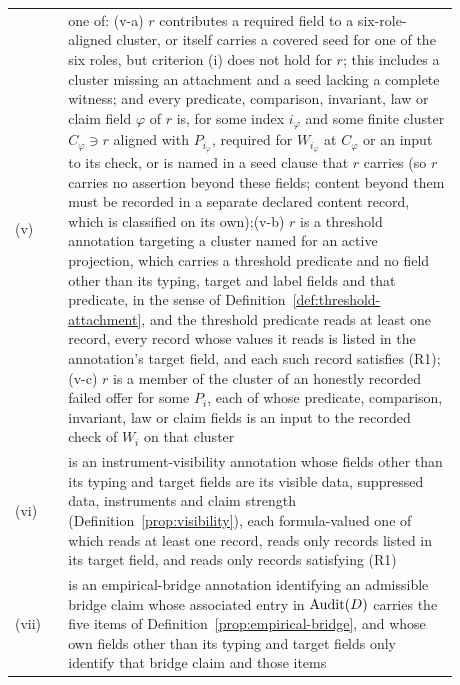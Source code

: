 \begin{longtable}{@{}l>{\raggedright\arraybackslash}p{0.88\linewidth}@{}}
(v) & one of: (v-a) \(r\) contributes a required field to a six-role-aligned cluster, or itself carries a covered seed for one of the six roles, but criterion (i) does not hold for \(r\); this includes a cluster missing an attachment and a seed lacking a complete witness; and every predicate, comparison, invariant, law or claim field \(\varphi\) of \(r\) is, for some index \(i_\varphi\) and some finite cluster \(C_\varphi\ni r\) aligned with \(P_{i_\varphi}\), required for \(W_{i_\varphi}\) at \(C_\varphi\) or an input to its check, or is named in a seed clause that \(r\) carries (so \(r\) carries no assertion beyond these fields; content beyond them must be recorded in a separate declared content record, which is classified on its own);\newline (v-b) \(r\) is a threshold annotation targeting a cluster named for an active projection, which carries a threshold predicate and no field other than its typing, target and label fields and that predicate, in the sense of Definition~\ref{def:threshold-attachment}, and the threshold predicate reads at least one record, every record whose values it reads is listed in the annotation's target field, and each such record satisfies (R1);\newline (v-c) \(r\) is a member of the cluster of an honestly recorded failed offer for some \(P_i\), each of whose predicate, comparison, invariant, law or claim fields is an input to the recorded check of \(W_i\) on that cluster \\
(vi) & is an instrument-visibility annotation whose fields other than its typing and target fields are its visible data, suppressed data, instruments and claim strength (Definition~\ref{prop:visibility}), each formula-valued one of which reads at least one record, reads only records listed in its target field, and reads only records satisfying (R1) \\
(vii) & is an empirical-bridge annotation identifying an admissible bridge claim whose associated entry in \(\operatorname{Audit}\!\left(D\right)\) carries the five items of Definition~\ref{prop:empirical-bridge}, and whose own fields other than its typing and target fields only identify that bridge claim and those items \\

\end{longtable}
